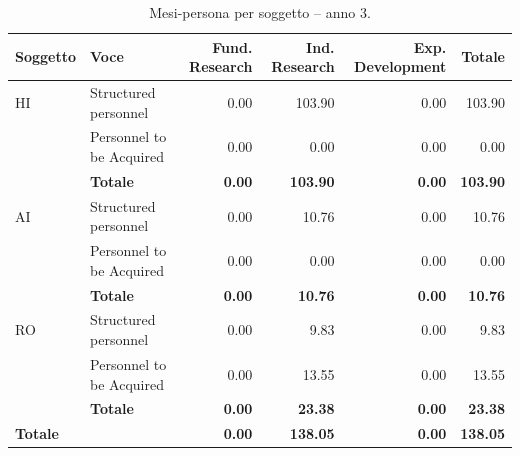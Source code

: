 \documentclass{plan4ari_report}
\begin{document}
\clearpage
\begin{table}[H]\centering\small\caption{Mesi-persona per soggetto -- anno 3.}\label{tab:wp-s-y3}
\begin{tabular}{llrrrr}\toprule\textbf{Soggetto} & \textbf{Voce} & \textbf{Fund. Research} & \textbf{Ind. Research} & \textbf{Exp. Development} & \textbf{Totale} \\\midrule
HI & Structured personnel & 0.00 & 103.90 & 0.00 & 103.90 \\
 & Personnel to be Acquired & 0.00 & 0.00 & 0.00 & 0.00 \\
 & \textbf{Totale} & \textbf{0.00} & \textbf{103.90} & \textbf{0.00} & \textbf{103.90} \\\midrule
AI & Structured personnel & 0.00 & 10.76 & 0.00 & 10.76 \\
 & Personnel to be Acquired & 0.00 & 0.00 & 0.00 & 0.00 \\
 & \textbf{Totale} & \textbf{0.00} & \textbf{10.76} & \textbf{0.00} & \textbf{10.76} \\\midrule
RO & Structured personnel & 0.00 & 9.83 & 0.00 & 9.83 \\
 & Personnel to be Acquired & 0.00 & 13.55 & 0.00 & 13.55 \\
 & \textbf{Totale} & \textbf{0.00} & \textbf{23.38} & \textbf{0.00} & \textbf{23.38} \\\midrule
\textbf{Totale} & & \textbf{0.00} & \textbf{138.05} & \textbf{0.00} & \textbf{138.05} \\
\bottomrule\end{tabular}\end{table}
\end{document}
